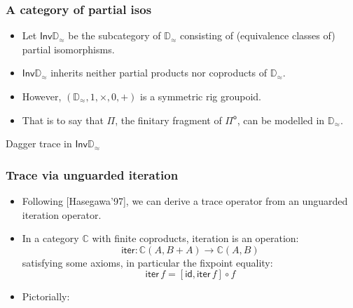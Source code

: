 \documentclass[12pt,t]{beamer}
\newcommand{\C}{\mathbb{C}}
\newcommand{\Pio}{\ensuremath{\mathsf{\Pi}^{\mathsf{o}}}}
\newcommand{\copair}[2]{[#1,#2]}
\newcommand{\Inv}{\mathsf{Inv}}
\newcommand{\iter}{\mathsf{iter}}
\newcommand{\id}{\mathsf{id}}
\newcommand{\Dapprox}{\mathbb{D}_{\approx}}
\begin{document}
\begin{frame}

  \frametitle{A category of partial isos}
  \begin{itemize}
  \item Let $\Inv \Dapprox$ be the subcategory of $\Dapprox$
    consisting of (equivalence classes of) partial isomorphisms.
  \item $\Inv\Dapprox$ inherits neither partial products nor
    coproducts of $\Dapprox$.
  \item However, $(\Dapprox,1,\times,0,+)$ is a symmetric rig
    groupoid.
  \item That is to say that $\Pi$, the finitary fragment of
    \Pio, can be modelled in $\Dapprox$.
  \end{itemize}
  
  
\end{frame}

\begin{frame}[c]
  \begin{center}
    \Huge Dagger trace in $\Inv\Dapprox$ 
  \end{center}
\end{frame}

\begin{frame}

  \frametitle{Trace via unguarded iteration}

  \begin{itemize}

  \item Following [Hasegawa'97], we can derive a trace operator from
    an unguarded iteration operator.
  \item In a category $\C$ with finite coproducts,  iteration is an operation:
    \[
    \iter : \C (A ,B + A) \to \C(A , B)
    \]
    satisfying some axioms, in particular the fixpoint equality:
    \[
    \iter\,f = \copair {\id} {\iter \,f} \circ f
    \]
  \item Pictorially:
  \end{itemize}
  
\end{frame}
\end{document}
